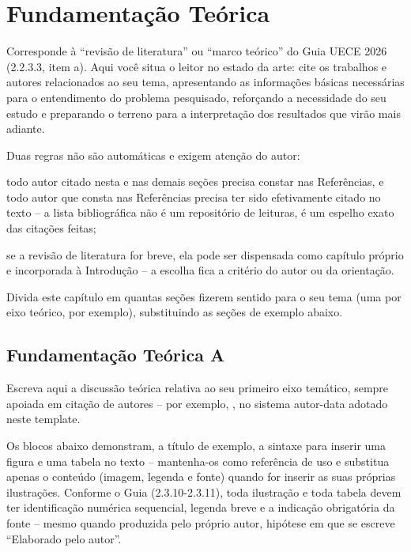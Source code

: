 \chapter{Fundamentação Teórica}
\label{cap:fundamentacao-teorica}

Corresponde à ``revisão de literatura'' ou ``marco teórico'' do Guia UECE 2026 (2.2.3.3, item a). Aqui você situa o leitor no estado da arte: cite os trabalhos e autores relacionados ao seu tema, apresentando as informações básicas necessárias para o entendimento do problema pesquisado, reforçando a necessidade do seu estudo e preparando o terreno para a interpretação dos resultados que virão mais adiante.

Duas regras não são automáticas e exigem atenção do autor:

\begin{alineas}
	\item todo autor citado nesta e nas demais seções precisa constar nas Referências, e todo autor que consta nas Referências precisa ter sido efetivamente citado no texto -- a lista bibliográfica não é um repositório de leituras, é um espelho exato das citações feitas;
	\item se a revisão de literatura for breve, ela pode ser dispensada como capítulo próprio e incorporada à Introdução -- a escolha fica a critério do autor ou da orientação.
\end{alineas}

Divida este capítulo em quantas seções fizerem sentido para o seu tema (uma por eixo teórico, por exemplo), substituindo as seções de exemplo abaixo.

\section{Fundamentação Teórica A}
\label{sec:fundamentacao-teorica-a}

Escreva aqui a discussão teórica relativa ao seu primeiro eixo temático, sempre apoiada em citação de autores -- por exemplo, \cite{lamport1986latex}, no sistema autor-data adotado neste template.

Os blocos abaixo demonstram, a título de exemplo, a sintaxe para inserir uma figura e uma tabela no texto -- mantenha-os como referência de uso e substitua apenas o conteúdo (imagem, legenda e fonte) quando for inserir as suas próprias ilustrações. Conforme o Guia (2.3.10-2.3.11), toda ilustração e toda tabela devem ter identificação numérica sequencial, legenda breve e a indicação obrigatória da fonte -- mesmo quando produzida pelo próprio autor, hipótese em que se escreve ``Elaborado pelo autor''.

